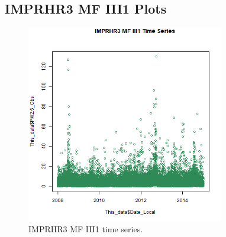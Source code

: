 
\subsection{IMPRHR3 MF III1 Plots}
\begin{figure} 
\centering 
\includegraphics[width=0.77\textwidth]{Code_Outputs/IMPRHR3MFIII1_time_series.png} 
\caption{\label{fig:IMPRHR3MFIII1TS}IMPRHR3 MF III1 time series.} 
\end{figure} 
 

